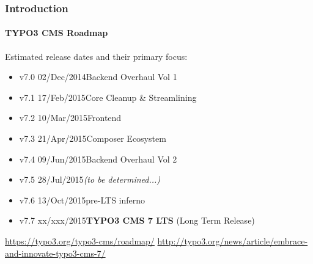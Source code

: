 
\begin{frame}[fragile]
	\frametitle{Introduction}
	\framesubtitle{TYPO3 CMS Roadmap}

	Estimated release dates and their primary focus:

	\begin{itemize}
		\item
			\begingroup
				\color{typo3orange}
					v7.0 \textrightarrow\tabto{1.3cm}02/Dec/2014\tabto{3.4cm}Backend Overhaul Vol 1
			\endgroup

		\item v7.1 \textrightarrow\tabto{1.3cm}17/Feb/2015\tabto{3.4cm}Core Cleanup \& Streamlining
		\item v7.2 \textrightarrow\tabto{1.3cm}10/Mar/2015\tabto{3.4cm}Frontend
		\item v7.3 \textrightarrow\tabto{1.3cm}21/Apr/2015\tabto{3.4cm}Composer Ecosystem
		\item v7.4 \textrightarrow\tabto{1.3cm}09/Jun/2015\tabto{3.4cm}Backend Overhaul Vol 2
		\item v7.5 \textrightarrow\tabto{1.3cm}28/Jul/2015\tabto{3.4cm}\textit{(to be determined...)}
		\item v7.6 \textrightarrow\tabto{1.3cm}13/Oct/2015\tabto{3.4cm}pre-LTS inferno
		\item v7.7 \textrightarrow\tabto{1.3cm}xx/xxx/2015\tabto{3.4cm}\textbf{TYPO3 CMS 7 LTS} (Long Term Release)
	\end{itemize}

	\smaller
		\url{https://typo3.org/typo3-cms/roadmap/}\newline
		\url{http://typo3.org/news/article/embrace-and-innovate-typo3-cms-7/}
	\normalsize

\end{frame}


